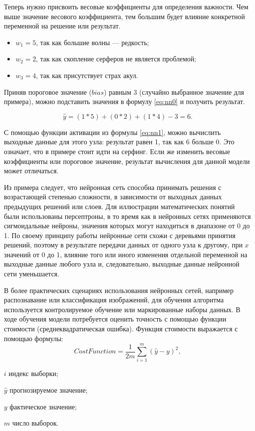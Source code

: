 Теперь нужно присвоить весовые коэффициенты для определения важности. Чем выше значение весового коэффициента, тем большим будет влияние конкретной переменной на решение или результат.

\begin{itemize}[leftmargin=1.6\parindent]
	\item $w_1 = 5$, так как большие волны --- редкость;
	\item $w_2 = 2$, так как скопление серферов не является проблемой;
	\item $w_3 = 4$, так как присутствует страх акул.
\end{itemize}

Приняв пороговое значение ($bias$) равным 3 (случайно выбранное значение для примера), можно подставить значения в формулу \ref{eq:nn0} и получить результат.

\begin{equation}
	\label{eq:nn2}
	\hat{y} = (1 * 5) + (0 * 2) + (1 * 4) - 3 = 6.
\end{equation}

С помощью функции активации из формулы \ref{eq:nn1}, можно вычислить выходные данные для этого узла: результат равен 1, так как 6 больше 0. Это означает, что в примере стоит идти на серфинг. Если же изменить весовые коэффициенты или пороговое значение, результат вычисления для данной модели может отличаться. 

Из примера следует, что нейронная сеть способна принимать решения с возрастающей степенью сложности, в зависимости от выходных данных предыдущих решений или слоев. Для иллюстрации математических понятий были использованы персептроны, в то время как в нейронных сетях применяются сигмоидальные нейроны, значения которых могут находиться в диапазоне от 0 до 1. По своему принципу работы нейронные сети схожи с деревьями принятия решений, поэтому в результате передачи данных от одного узла к другому, при $x$ значений от 0 до 1, влияние того или иного изменения отдельной переменной на выходные данные любого узла и, следовательно, выходные данные нейронной сети уменьшается.

В более практических сценариях использования нейронных сетей, например распознавание или классификация изображений, для обучения алгоритма используется контролируемое обучение или маркированные наборы данных. В ходе обучения модели потребуется оценить точность с помощью функции стоимости (среднеквадратическая ошибка). Функция стоимости выражается с помощью формулы:
\begin{equation}
	\label{eq:nn3}
	Cost Function = \frac{1}{2m}\sum_{i=1}^{m}(\hat{y}-y)^2,
\end{equation}
\begin{eqexpl}[15mm]
	\item{$i$} индекс выборки;
	\item{$\hat{y}$} прогнозируемое значение;
	\item{$y$} фактическое значение;
	\item{$m$} число выборок.
\end{eqexpl}

